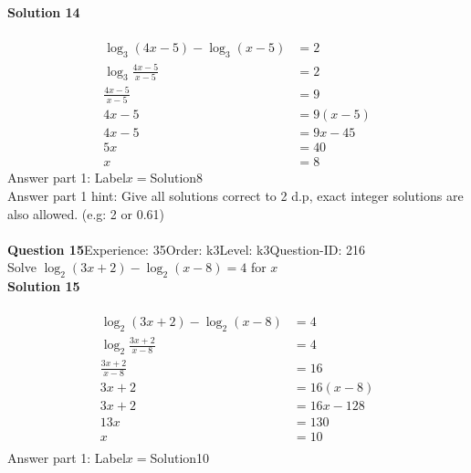 \documentclass{article}
\begin{document}
\noindent\textbf{Solution 14}\\[2pt]
\\[-35pt]\begin{align*}
\log_{3}(4x-5)-\log_{3}(x-5)&=2\\[2pt]
\log_{3}\displaystyle\frac{4x-5}{x-5}&=2\\[2pt]
\displaystyle\frac{4x-5}{x-5}&=9\\[2pt]
4x-5&=9(x-5)\\[2pt]
4x-5&=9x-45\\[2pt]
5x&=40\\[2pt]
x&=8
\end{align*}
Answer part 1: \hspace{10pt}Label\hspace{10pt}$x=$\hspace{10pt}Solution\hspace{10pt}8\\
Answer part 1 hint: \hspace{15pt}Give all solutions correct to 2 d.p, exact integer solutions are also allowed. (e.g: 2 or 0.61)\\
\\[4pt]
\noindent\textbf{Question 15}\hspace{20pt}Experience: 35\hspace{20pt}Order: k3\hspace{20pt}Level: k3\hspace{20pt}Question-ID: 216\\[2pt]
Solve $\log_{2}(3x+2)-\log_{2}(x-8)=4$ for $x$\\[4pt]
\noindent\textbf{Solution 15}\\[2pt]
\\[-35pt]\begin{align*}
\log_{2}(3x+2)-\log_{2}(x-8)&=4\\[2pt]
\log_{2}\displaystyle\frac{3x+2}{x-8}&=4\\[2pt]
\displaystyle\frac{3x+2}{x-8}&=16\\[2pt]
3x+2&=16(x-8)\\[2pt]
3x+2&=16x-128\\[2pt]
13x&=130\\[2pt]
x&=10\\[-50pt]
\end{align*}
Answer part 1: \hspace{10pt}Label\hspace{10pt}$x=$\hspace{10pt}Solution\hspace{10pt}10\\
\end{document}
